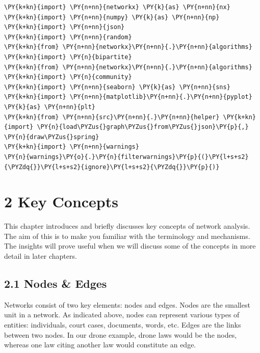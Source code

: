     
    

    
    \begin{tcolorbox}[breakable, size=fbox, boxrule=1pt, pad at break*=1mm,colback=cellbackground, colframe=cellborder]
\begin{Verbatim}[commandchars=\\\{\}]
\PY{k+kn}{import} \PY{n+nn}{networkx} \PY{k}{as} \PY{n+nn}{nx}
\PY{k+kn}{import} \PY{n+nn}{numpy} \PY{k}{as} \PY{n+nn}{np}
\PY{k+kn}{import} \PY{n+nn}{json}
\PY{k+kn}{import} \PY{n+nn}{random}
\PY{k+kn}{from} \PY{n+nn}{networkx}\PY{n+nn}{.}\PY{n+nn}{algorithms} \PY{k+kn}{import} \PY{n}{bipartite}
\PY{k+kn}{from} \PY{n+nn}{networkx}\PY{n+nn}{.}\PY{n+nn}{algorithms} \PY{k+kn}{import} \PY{n}{community}
\PY{k+kn}{import} \PY{n+nn}{seaborn} \PY{k}{as} \PY{n+nn}{sns}
\PY{k+kn}{import} \PY{n+nn}{matplotlib}\PY{n+nn}{.}\PY{n+nn}{pyplot} \PY{k}{as} \PY{n+nn}{plt}
\PY{k+kn}{from} \PY{n+nn}{src}\PY{n+nn}{.}\PY{n+nn}{helper} \PY{k+kn}{import} \PY{n}{load\PYZus{}graph\PYZus{}from\PYZus{}json}\PY{p}{,} \PY{n}{draw\PYZus{}spring}
\PY{k+kn}{import} \PY{n+nn}{warnings}
\PY{n}{warnings}\PY{o}{.}\PY{n}{filterwarnings}\PY{p}{(}\PY{l+s+s2}{\PYZdq{}}\PY{l+s+s2}{ignore}\PY{l+s+s2}{\PYZdq{}}\PY{p}{)}
\end{Verbatim}
\end{tcolorbox}

    \hypertarget{key-concepts}{%
\section{2 Key Concepts}\label{key-concepts}}

This chapter introduces and briefly discusses key concepts of network
analysis. The aim of this is to make you familiar with the terminology
and mechanisms. The insights will prove useful when we will discuss some
of the concepts in more detail in later chapters.

    \hypertarget{nodes-edges}{%
\subsection{2.1 Nodes \& Edges}\label{nodes-edges}}

Networks consist of two key elements: nodes and edges. Nodes are the
smallest unit in a network. As indicated above, nodes can represent
various types of entities: individuals, court cases, documents, words,
etc. Edges are the links between two nodes. In our drone example, drone
laws would be the nodes, whereas one law citing another law would
constitute an edge.

